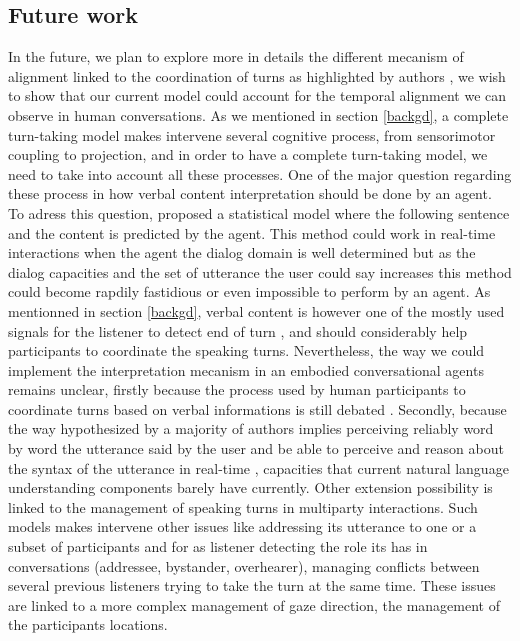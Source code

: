 \subsection{Future work}

In the future, we plan to explore more in details the different mecanism of alignment linked to the coordination of turns as highlighted by authors \citep{benus_pragmatic_2011}, we wish to show that our current model could account for the temporal alignment we can observe in human conversations.  
As we mentioned in section \ref{backgd}, a complete turn-taking model makes intervene several cognitive process, from sensorimotor coupling to projection, and in order to have a complete turn-taking model, we need to take into account all these processes. One of the major question regarding these process in how verbal content interpretation should be done by an agent. To adress this question, \cite{de_vault_incremental_2011} proposed a statistical model where the following sentence and the content is predicted by the agent. This method could work in real-time interactions when the agent the dialog domain is well determined but as the dialog capacities and the set of utterance the user could say increases this method could become rapdily fastidious or even impossible to perform by an agent. 
As mentionned in section \ref{backgd}, verbal content is however one of the mostly used signals for the listener to detect end of turn \cite{de_ruiter_projecting_2006}, and should considerably help participants to coordinate the speaking turns. Nevertheless, the way we could implement the interpretation mecanism in an embodied conversational agents remains unclear, firstly because the process used by human participants to coordinate turns based on verbal informations is still debated \citep{heldner_pauses_2010,magyari_prediction_2012,riest_anticipation_2015}. Secondly, because the way hypothesized by a majority of authors implies perceiving reliably word by word the utterance said by the user and be able to perceive and reason about the syntax of the utterance in real-time \citep{sacks_simplest_1974}, capacities that current natural language understanding components barely have currently. 
Other extension possibility is linked to the management of speaking turns in multiparty interactions. Such models makes intervene other issues like addressing its utterance to one or a subset of participants and for as listener detecting the role its has in conversations (addressee, bystander, overhearer), managing conflicts between several previous listeners trying to take the turn at the same time. These issues are linked to a more complex management of gaze direction, the management of the participants locations. 
